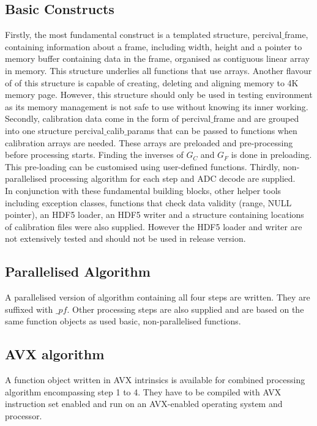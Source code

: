 \documentclass[journal]{IEEEtran}
\begin{document}
\subsection{Basic Constructs}
Firstly, the most fundamental construct is a templated structure, percival$\_$frame, containing information about a frame, including width, height and a pointer to memory buffer containing data in the frame, organised as contiguous linear array in memory. This structure underlies all functions that use arrays. Another flavour of of this structure is capable of creating, deleting and aligning memory to 4K memory page. However, this structure should only be used in testing environment as its memory management is not safe to use without knowing its inner working. Secondly, calibration data come in the form of percival$\_$frame and are grouped into one structure percival$\_$calib$\_$params that can be passed to functions when calibration arrays are needed. These arrays are preloaded and pre-processing before processing starts. Finding the inverses of $G_C$ and $G_F$ is done in preloading. This pre-loading can be customised using user-defined functions. Thirdly, non-parallelised processing algorithm for each step and ADC decode are supplied. \\
In conjunction with these fundamental building blocks, other helper tools including exception classes, functions that check data validity (range, NULL pointer), an HDF5 loader, an HDF5 writer and a structure containing locations of calibration files were also supplied. However the HDF5 loader and writer are not extensively tested and should not be used in release version. \\

\subsection{Parallelised Algorithm}
A parallelised version of algorithm containing all four steps are written. They are suffixed with $\_pf$. Other processing steps are also supplied and are based on the same function objects as used basic, non-parallelised functions.

\subsection{AVX algorithm}
A function object written in AVX intrinsics is available for combined processing algorithm encompassing step 1 to 4. They have to be compiled with AVX instruction set enabled and run on an AVX-enabled operating system and processor.
\end{document}
